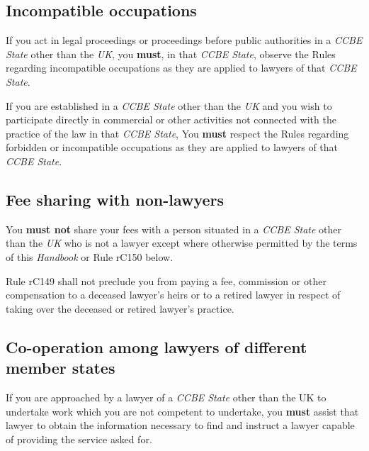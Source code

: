 

\subsection{Incompatible occupations}


If you act in legal proceedings or proceedings before public authorities
in a \emph{CCBE State} other than the \emph{UK}, you \textcolor{myred}{\textbf{must}}, in that
\emph{CCBE State}, observe the Rules regarding incompatible occupations
as they are applied to lawyers of that \emph{CCBE State}.


If you are established in a \emph{CCBE State} other than the \emph{UK}
and you wish to participate directly in commercial or other activities
not connected with the practice of the law in that \emph{CCBE State},
You \textcolor{myred}{\textbf{must}} respect the Rules regarding forbidden or incompatible
occupations as they are applied to lawyers of that \emph{CCBE State}.

\subsection{Fee sharing with non-lawyers}


You \textcolor{myred}{\textbf{must not}} share your fees with a person situated in a \emph{CCBE
State} other than the \emph{UK} who is not a lawyer except where
otherwise permitted by the terms of this \emph{Handbook} or Rule rC150
below.


Rule rC149 shall not preclude you from paying a fee, commission or other
compensation to a deceased lawyer's heirs or to a retired lawyer in
respect of taking over the deceased or retired lawyer's practice.

\subsection{Co-operation among lawyers of different member states}


If you are approached by a lawyer of a \emph{CCBE State} other than the
UK to undertake work which you are not competent to undertake, you \textcolor{myred}{\textbf{must}}
assist that lawyer to obtain the information necessary to find and
instruct a lawyer capable of providing the service asked for.

